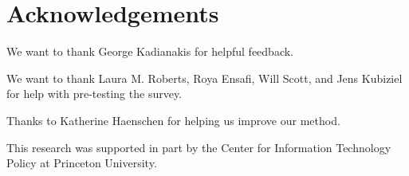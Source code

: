 \section*{Acknowledgements}
We want to thank George Kadianakis for helpful feedback.

We want to thank Laura M. Roberts, Roya Ensafi, Will Scott, and Jens Kubiziel
for help with pre-testing the survey.

Thanks to Katherine Haenschen for helping us improve our method.

This research was supported in part by the Center for Information Technology
Policy at Princeton University.
